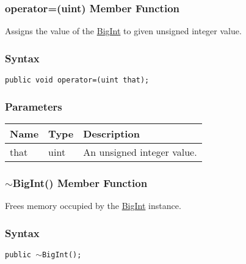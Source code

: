 \documentclass[a4paper,oneside,11.000000pt]{book}
\begin{document}
\hypertarget{System.Numerics.Multiprecision.BigInt.operator.assign.P.System.Numerics.Multiprecision.BigInt.uint}{\subsubsection*{operator=(uint) Member Function}}
\begin{flushleft}
Assigns the value of the \hyperlink{System.Numerics.Multiprecision.BigInt}{BigInt} to given unsigned integer value.

\end{flushleft}
\subsubsection*{Syntax}\texttt{public void operator=(uint that);}

\subsubsection*{Parameters}
\begin{flushleft}
\begin{supertabular}[l]{lll}
\textbf{Name}
& \textbf{Type}
& \textbf{Description}
\\
\hline
that
& uint
& An unsigned integer value.

\\
\end{supertabular}

\end{flushleft}
\clearpage

\hypertarget{System.Numerics.Multiprecision.BigInt.destructor.P.System.Numerics.Multiprecision.BigInt}{\subsubsection*{$\sim$BigInt() Member Function}}
\begin{flushleft}
Frees memory occupied by the \hyperlink{System.Numerics.Multiprecision.BigInt}{BigInt} instance.

\end{flushleft}
\subsubsection*{Syntax}\texttt{public $\sim$BigInt();}
\end{document}
